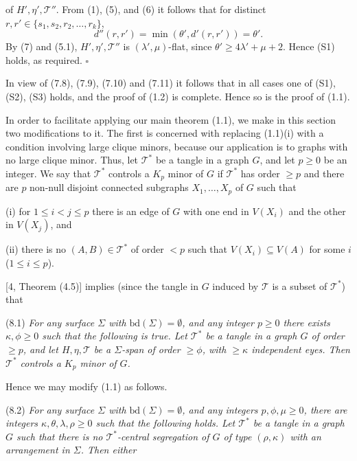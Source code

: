 \noindent of $H', \eta', \mathcal{T}''$. From (1), (5), and (6) it follows that for distinct $r, r' \in \{s_1, s_2, r_2, \dots, r_k\}$,
\begin{equation*}
d''(r, r') = \min(\theta', d'(r, r')) = \theta'.
\end{equation*}
By (7) and (5.1), $H', \eta', \mathcal{T}''$ is $(\lambda', \mu)$-flat, since $\theta' \ge 4\lambda' + \mu + 2$. Hence (S1) holds, as required. $\square$

In view of (7.8), (7.9), (7.10) and (7.11) it follows that in all cases one of (S1), (S2), (S3) holds, and the proof of (1.2) is complete. Hence so is the proof of (1.1).


In order to facilitate applying our main theorem (1.1), we make in this section two modifications to it. The first is concerned with replacing (1.1)(i) with a condition involving large clique minors, because our application is to graphs with no large clique minor. Thus, let $\mathcal{T}^*$ be a tangle in a graph $G$, and let $p \ge 0$ be an integer. We say that $\mathcal{T}^*$ controls a $K_p$ minor of $G$ if $\mathcal{T}^*$ has order $\ge p$ and there are $p$ non-null disjoint connected subgraphs $X_1, \dots, X_p$ of $G$ such that

\hspace*{12pt}(i) for $1 \le i < j \le p$ there is an edge of $G$ with one end in $V(X_i)$ and the other in $V(X_j)$, and

\hspace*{12pt}(ii) there is no $(A, B) \in \mathcal{T}^*$ of order $< p$ such that $V(X_i) \subseteq V(A)$ for some $i$ ($1 \le i \le p$).

[4, Theorem (4.5)] implies (since the tangle in $G$ induced by $\mathcal{T}$ is a subset of $\mathcal{T}^*$) that

\stmt
(8.1) \textit{For any surface $\Sigma$ with $\text{bd}(\Sigma) = \emptyset$, and any integer $p \ge 0$ there exists $\kappa, \phi \ge 0$ such that the following is true. Let $\mathcal{T}^*$ be a tangle in a graph $G$ of order $\ge p$, and let $H, \eta, \mathcal{T}$ be a $\Sigma$-span of order $\ge \phi$, with $\ge \kappa$ independent eyes. Then $\mathcal{T}^*$ controls a $K_p$ minor of $G$.}

Hence we may modify (1.1) as follows.

\stmt
(8.2) \textit{For any surface $\Sigma$ with $\text{bd}(\Sigma) = \emptyset$, and any integers $p, \phi, \mu \ge 0$, there are integers $\kappa, \theta, \lambda, \rho \ge 0$ such that the following holds. Let $\mathcal{T}^*$ be a tangle in a graph $G$ such that there is no $\mathcal{T}^*$-central segregation of $G$ of type $(\rho, \kappa)$ with an arrangement in $\Sigma$. Then either}
